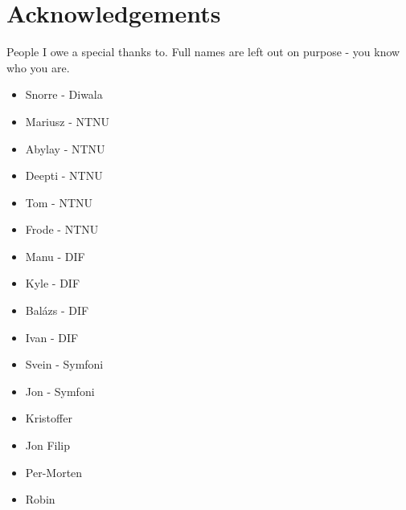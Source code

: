 \chapter*{Acknowledgements}

People I owe a special thanks to. Full names are left out on purpose - you know who you are.

\begin{itemize}
\tightlist
\item
    Snorre - Diwala
\item
    Mariusz - NTNU
\item
    Abylay - NTNU
\item
    Deepti - NTNU
\item
    Tom - NTNU
\item
    Frode - NTNU
\item
    Manu - DIF
\item
    Kyle - DIF
\item
    Balázs - DIF
\item
    Ivan - DIF
\item
    Svein - Symfoni
\item
    Jon - Symfoni
\item
    Kristoffer
\item
    Jon Filip
\item
    Per-Morten
\item
    Robin
\end{itemize}
